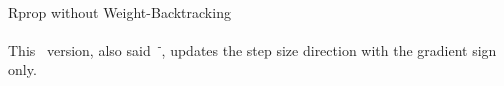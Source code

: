 \begin{subsection}{Rprop without Weight-Backtracking}
    \par This~ version, also said~\textsuperscript{-}, updates the step size direction with the gradient sign only.
    
    \clearpage
\end{subsection}